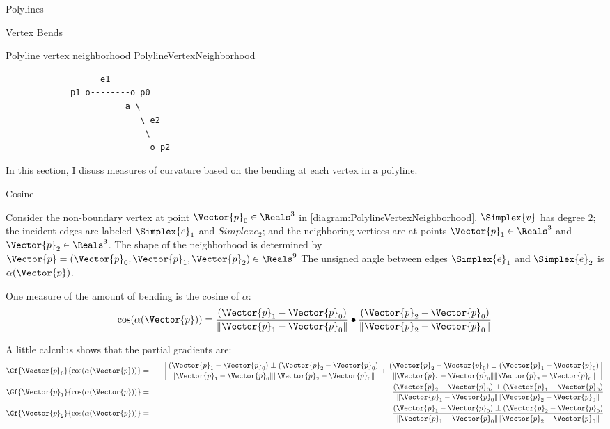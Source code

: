 \begin{plSection}{Polylines}
\begin{plSection}{Vertex Bends}
\label{sec:Vertex-Bends}

\begin{plDiagram}
{Polyline vertex neighborhood}
{PolylineVertexNeighborhood}
\centering
\begin{verbatim}
                   e1
             p1 o--------o p0
                        a \
                           \ e2
                            \
                             o p2
\end{verbatim}
\end{plDiagram}

In this section, I disuss measures of curvature
based on the bending at each vertex in a polyline.

\end{plSection}%
\begin{plSection}{Cosine}
\label{sec:polyline-vertex-cosine}

Consider the non-boundary vertex
at point $\Vector{p}_0 \in \Reals^3$ in \cref{diagram:PolylineVertexNeighborhood}.
$\Simplex{v}$ has degree $2$;
the incident edges are labeled $\Simplex{e}_1$ and $Simplex{e}_2$;
and the neighboring vertices are at points $\Vector{p}_1 \in \Reals^3$
and $\Vector{p}_2 \in \Reals^3$.
The shape of the neighborhood is determined by
$\Vector{p} = (\Vector{p}_0, \Vector{p}_1, \Vector{p}_2) \in \Reals^9$
The unsigned angle between edges 
$\Simplex{e}_1$ and $\Simplex{e}_2$ is $\alpha(\Vector{p})$.

One measure of the amount of bending is the cosine of $\alpha$:
\begin{equation}
\cos(\alpha(\Vector{p})) =
{{(\Vector{p}_1 - \Vector{p}_0)} \over {\| \Vector{p}_1 - \Vector{p}_0 \|} }
\bullet
{{(\Vector{p}_2 - \Vector{p}_0)} \over {\| \Vector{p}_2 - \Vector{p}_0 \|} }
\end{equation}

A little calculus shows that the partial gradients are:
\begin{eqnarray}
\label{eq:polyline-vertex-cosine-gradient}
\Gf{\Vector{p}_0}{\cos(\alpha(\Vector{p}))}
& = &
-
\left[
{{(\Vector{p}_1 - \Vector{p}_0) \perp  (\Vector{p}_2 - \Vector{p}_0)}
\over
{\| \Vector{p}_1 - \Vector{p}_0 \| \| \Vector{p}_2 - \Vector{p}_0 \|} }
+
{{(\Vector{p}_2 - \Vector{p}_0) \perp  (\Vector{p}_1 - \Vector{p}_0)}
\over
{\| \Vector{p}_1 - \Vector{p}_0 \| \| \Vector{p}_2 - \Vector{p}_0 \|} }
\right]
\\
\Gf{\Vector{p}_1}{\cos(\alpha(\Vector{p}))}
& = &
{{(\Vector{p}_2 - \Vector{p}_0) \perp  (\Vector{p}_1 - \Vector{p}_0)}
\over
{\| \Vector{p}_1 - \Vector{p}_0 \| \| \Vector{p}_2 - \Vector{p}_0 \|} }
\nonumber
\\
\Gf{\Vector{p}_2}{\cos(\alpha(\Vector{p}))}
& = &
{{(\Vector{p}_1 - \Vector{p}_0) \perp  (\Vector{p}_2 - \Vector{p}_0)}
\over
{\| \Vector{p}_1 - \Vector{p}_0 \| \| \Vector{p}_2 - \Vector{p}_0 \|} }
\nonumber
\end{eqnarray}


\end{plSection}
\end{plSection}
